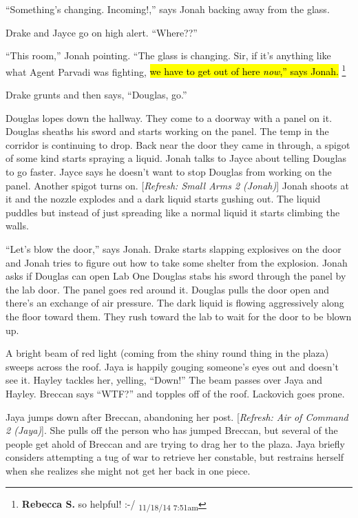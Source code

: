 ``Something's changing.  Incoming!,'' says Jonah backing away from the glass.

Drake and Jayce go on high alert.  ``Where??''

``This room,'' Jonah pointing.  ``The glass is changing.  Sir, if it's anything like what Agent Parvadi was fighting, \hl{we have to get out of here \textit{now},'' says Jonah. }\footnote{\textbf{Rebecca S. }so helpful! :-/ \textsubscript{11/18/14 7:51am}} 

Drake grunts and then says, ``Douglas, go.''

Douglas lopes down the hallway. They come to a doorway with a panel on it.  Douglas sheaths his sword and starts working on the panel.  The temp in the corridor is continuing to drop.  Back near the door they came in through, a spigot of some kind starts spraying a liquid.  Jonah talks to Jayce about telling Douglas to go faster.  Jayce says he doesn't want to stop Douglas from working on the panel.  Another spigot turns on.  {[}\textit{Refresh: Small Arms 2 (Jonah)}{]}  Jonah shoots at it and the nozzle explodes and a dark liquid starts gushing out.  The liquid puddles but instead of just spreading like a normal liquid it starts climbing the walls.



``Let's blow the door,'' says Jonah.  Drake starts slapping explosives on the door and Jonah tries to figure out how to take some shelter from the explosion.  Jonah asks if Douglas can open Lab One  Douglas stabs his sword through the panel by the lab door.  The panel goes red around it.  Douglas pulls the door open and there's an exchange of air pressure.  The dark liquid is flowing aggressively along the floor toward them.  They rush toward the lab to wait for the door to be blown up.





A bright beam of red light (coming from the shiny round thing in the plaza) sweeps across the roof.  Jaya is happily gouging someone's eyes out and doesn't see it.  Hayley tackles her, yelling, ``Down!''  The beam passes over Jaya and Hayley.  Breccan says ``WTF?'' and topples off of the roof.  Lackovich goes prone.



Jaya jumps down after Breccan, abandoning her post. {[}\textit{Refresh: Air of Command 2 (Jaya)}{]}.  She pulls off the person who has jumped Breccan, but several of the people get ahold of Breccan and are trying to drag her to the plaza.  Jaya briefly considers attempting a tug of war to retrieve her constable, but restrains herself when she realizes she might not get her back in one piece.



